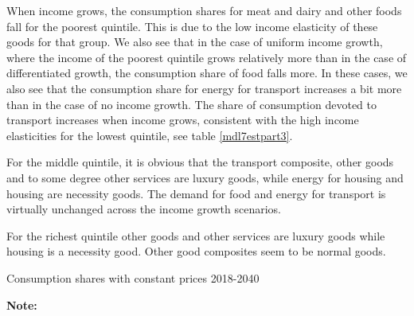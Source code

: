 When income grows, the consumption shares for meat and dairy and other foods fall for the poorest quintile. This is due to the low income elasticity of these goods for that group. We also see that in the case of uniform income growth, where the income of the poorest quintile grows relatively more than in the case of differentiated growth, the consumption share of food falls more. In these cases, we also see that the consumption share for energy for transport increases a bit more than in the case of no income growth. The share of consumption devoted to transport increases when income grows, consistent with the high income elasticities for the lowest quintile, see table \ref{mdl7estpart3}. 

For the middle quintile, it is obvious that the transport composite, other goods and to some degree other services are luxury goods, while energy for housing and housing are necessity goods. The demand for food and energy for transport is virtually unchanged across the income growth scenarios. 

For the richest quintile other goods and other services are luxury goods while housing is a necessity good. Other good composites seem to be normal goods. 

\begin{table}[H]
    \centering
    \caption{Consumption shares with constant prices 2018-2040}
    \label{wtable}
    \resizebox{\textwidth}{!}{%
    
    }
    \captionsetup{singlelinecheck=off,size=scriptsize}
\setlength{\captionmargin}{10pt}
\caption*{
\textbf{Note:} }
\end{table}

